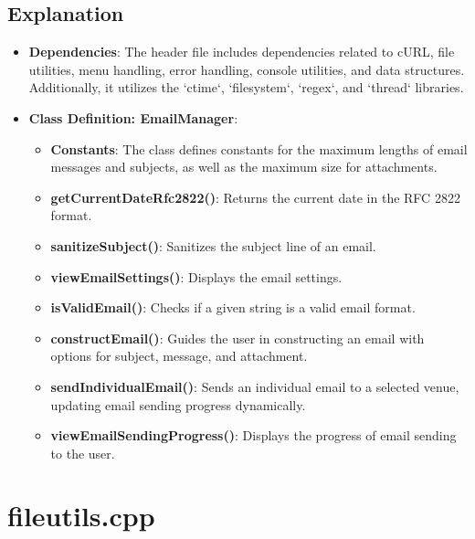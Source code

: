 \documentclass{article}
\begin{document}
	\subsection*{Explanation}
	\begin{itemize}
		\item \textbf{Dependencies}: The header file includes dependencies related to cURL, file utilities, menu handling, error handling, console utilities, and data structures. Additionally, it utilizes the `ctime`, `filesystem`, `regex`, and `thread` libraries.
		\item \textbf{Class Definition: EmailManager}:
		\begin{itemize}
			\item \textbf{Constants}: The class defines constants for the maximum lengths of email messages and subjects, as well as the maximum size for attachments.
			\item \textbf{getCurrentDateRfc2822()}: Returns the current date in the RFC 2822 format.
			\item \textbf{sanitizeSubject()}: Sanitizes the subject line of an email.
			\item \textbf{viewEmailSettings()}: Displays the email settings.
			\item \textbf{isValidEmail()}: Checks if a given string is a valid email format.
			\item \textbf{constructEmail()}: Guides the user in constructing an email with options for subject, message, and attachment.
			\item \textbf{sendIndividualEmail()}: Sends an individual email to a selected venue, updating email sending progress dynamically.
			\item \textbf{viewEmailSendingProgress()}: Displays the progress of email sending to the user.
		\end{itemize}
	\end{itemize}
	
	\section{fileutils.cpp}
	
\end{document}
